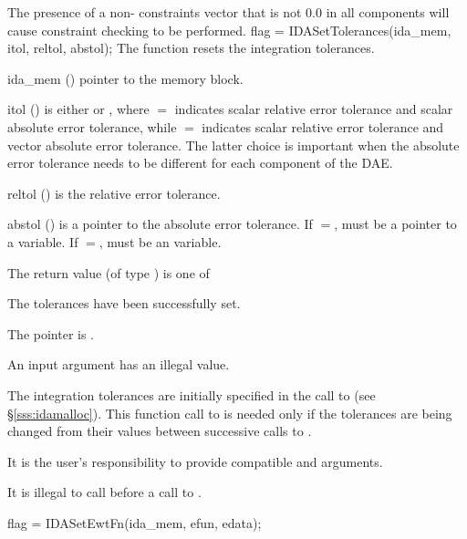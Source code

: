 {
  The presence of a non- constraints vector that is not $0.0$ in
  all components will cause constraint checking to be performed.
}
{
flag = IDASetTolerances(ida\_mem, itol, reltol, abstol);
}
{
  The function  resets the integration tolerances.
}
{
  \begin{args}
  \item[ida\_mem] ()
    pointer to the {\ida} memory block.
  \item[itol] () 
    is either  or , where $=$ indicates
    scalar relative error tolerance and scalar absolute error tolerance, while
    $=$ indicates scalar relative error tolerance and vector
    absolute error tolerance.  The latter choice is important when the absolute
    error tolerance needs to be different for each component of the DAE. 
  \item[reltol] ()
    is the relative error tolerance.
  \item[abstol] ()
    is a pointer to the absolute error tolerance. If $=$, 
    must be a pointer to a  variable. If $=$, 
    must be an  variable.
  \end{args}
}
{
  The return value  (of type ) is one of
  \begin{args}
  \item[\Id{IDA\_SUCCESS}] 
    The tolerances have been successfully set.
  \item[\Id{IDA\_MEM\_NULL}]
    The  pointer is .
  \item[\Id{IDA\_ILL\_INPUT}]
    An input argument has an illegal value.
  \end{args}
}
{
  The integration tolerances are initially specified in the call
  to  (see \S\ref{sss:idamalloc}). This function call
  to  is needed only if the tolerances are being changed
  from their values between successive calls to .

  {\warn} It is the user's responsibility to provide compatible  and
   arguments.

  {\warn} It is illegal to call  before a call to .

}
{
flag = IDASetEwtFn(ida\_mem, efun, edata);
}
